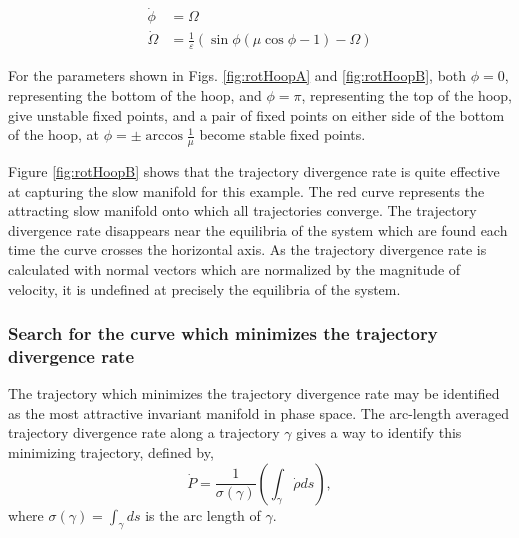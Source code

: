\documentclass[twocolumn]{svjour3}
\begin{document}
\begin{equation}
\begin{aligned}
\dot{\phi} & = \Omega \\
\dot{\Omega } & = \frac{1}{\varepsilon}\left(\sin\phi(\mu\cos\phi - 1) - \Omega\right)
\end{aligned}
\label{eq:rotHoop}
\end{equation}

For the parameters shown in Figs. \ref{fig:rotHoopA} and \ref{fig:rotHoopB}, both $\phi=0$, representing the bottom of the hoop, and $\phi=\pi$, representing the top of the hoop, give unstable fixed points, and a pair of fixed points on either side of the bottom of the hoop, at $\phi=\pm\arccos\tfrac{1}{\mu}$ become stable fixed points.

Figure \ref{fig:rotHoopB} shows that the trajectory divergence rate is quite effective at capturing the slow manifold for this example. The red curve represents the attracting slow manifold onto which all trajectories converge. The trajectory divergence rate disappears near the equilibria of the system which are found each time the curve crosses the horizontal axis. As the trajectory divergence rate is calculated with normal vectors which are normalized by the magnitude of velocity, it is undefined at precisely the equilibria of the system.

\subsubsection{Search for the curve which minimizes the trajectory divergence rate}
The trajectory which minimizes the trajectory divergence rate may be identified as the most attractive invariant manifold in phase space. The arc-length averaged trajectory divergence rate along a trajectory $\gamma$ gives a way to identify this minimizing trajectory, defined by,
\begin{equation}
\dot{P}=\frac{1}{\sigma(\gamma)}\left(\int_\gamma\dot{\rho}ds\right),
\end{equation}
where $\sigma(\gamma)=\int_{\gamma}ds$ is the arc length of $\gamma$.
\end{document}
